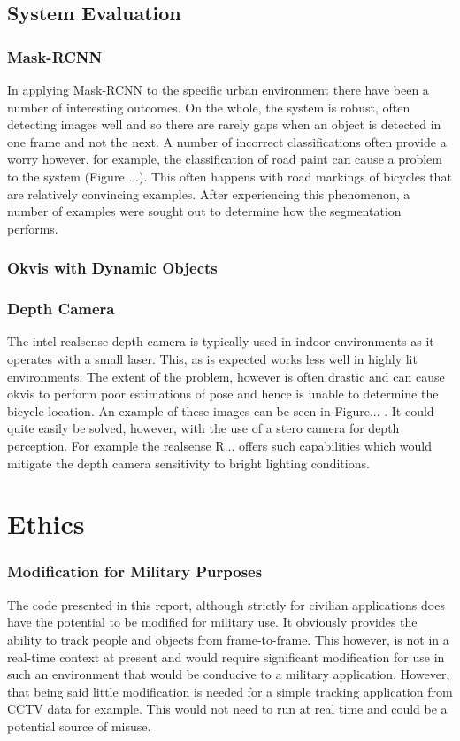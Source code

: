\documentclass[11pt,twoside]{report}
\begin{document}
\section{System Evaluation}

\subsection{Mask-RCNN}
In applying Mask-RCNN to the specific urban environment there have been a number of interesting outcomes. On the whole, the system is robust, often detecting images well and so there are rarely gaps when an object is detected in one frame and not the next. A number of incorrect classifications often provide a worry however, for example, the classification of road paint can cause a problem to the system (Figure ...). This often happens with road markings of bicycles that are relatively convincing examples. After experiencing this phenomenon, a number of examples were sought out to determine how the segmentation performs.

\subsection{Okvis with Dynamic Objects}


\subsection{Depth Camera}

The intel realsense depth camera is typically used in indoor environments as it operates with a small laser. This, as is expected works less well in highly lit environments. The extent of the problem, however is often drastic and can cause okvis to perform poor estimations of pose and hence is unable to determine the bicycle location. An example of these images can be seen in Figure... . It could quite easily be solved, however, with the use of a stero camera for depth perception. For example the realsense R... offers such capabilities which would mitigate the depth camera sensitivity to bright lighting conditions.



\newpage


\chapter{Ethics}

\subsection{Modification for Military Purposes}
The code presented in this report, although strictly for civilian applications does have the potential to be modified for military use. It obviously provides the ability to track people and objects from frame-to-frame. This however, is not in a real-time context at present and would require significant modification for use in such an environment that would be conducive to a military application. However, that being said little modification is needed for a simple tracking application from CCTV data for example. This would not need to run at real time and could be a potential source of misuse.
\end{document}
